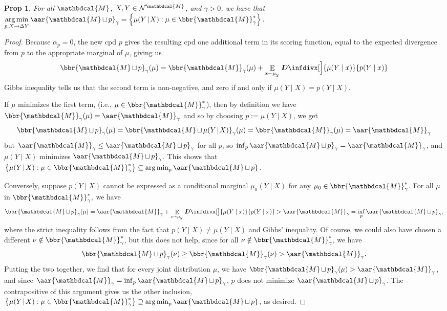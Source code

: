 \documentclass{article}
\theoremstyle{plain}
\newtheorem{prop}[theorem]{Prop}
\theoremstyle{definition}
\theoremstyle{remark}
\DeclareMathOperator*{\Ex}{\mathbb{E}} %
\DeclareMathOperator*{\argmin}{arg\,min}
\newcommand{\thickD}{I\mkern-8muD}
\newcommand{\kldiv}{\thickD\infdivx}
\newcommand{\N}{\mathcal N}
\newcommand{\dg}[1]{\mathbdcal{#1}}
\newcommand\smid{\!\mid\!}
\DeclareMathOperator{\bundle}{\sqcup}
\begin{document}
\begin{prop}
	For all $\dg M$, $X,Y\in\N^{\dg M}$, and $\gamma > 0$, we have that 
	$\displaystyle
		\argmin_{p : X \to \Delta Y} \aar{\dg M \bundle p}_\gamma = 
		\Big\{ \mu(Y \smid X) :  \mu \in \bbr{\dg M}_\gamma^* \Big\}
	$.
\end{prop}
\begin{proof}
	Because $\alpha_p = 0$, the new cpd $p$ gives the resulting cpd one 
	additional term in its scoring function, equal to the expected
	divergence from $p$ to the appropriate marginal of $\mu$, giving us
	$$
		\bbr{\dg M \bundle p}_\gamma(\mu) = \bbr{\dg M }_\gamma(\mu)
			+ \Ex_{x\sim\mu_{\!_X}} \kldiv[\Big]{\mu(Y\mid x)}{p(Y\mid x)}
	$$
	Gibbs inequality tells us that the second term is non-negative, and zero
	if and only if $\mu(Y \mid X) = p(Y \mid X)$. 
	
	If $\mu$ minimizes the first term, (i.e., $\mu \in \bbr{\dg M}^*_\gamma$), then by definition we have $\bbr{\dg M}_\gamma(\mu) = \aar{\dg M}_\gamma$ and so by choosing $p := \mu(Y \mid X)$, we get
	$$	\bbr{\dg M \bundle p}_\gamma(\mu) =
		\bbr{\dg M \bundle \mu(Y \smid X)}_\gamma(\mu) = \bbr{\dg M}_\gamma(\mu)
		= \aar{\dg M}_\gamma$$ 
	but $\aar{\dg M}_\gamma \leq \aar{\dg M \bundle p}_\gamma$ for all $p$, so
	$\inf_p \aar{\dg M \bundle p}_\gamma = \aar{\dg M}_\gamma$,
	and $\mu(Y\smid X)$ minimizes $\aar{\dg M \bundle p}_\gamma$. 
	This shows that $\big\{\mu(Y\smid X) : \mu \in \bbr{\dg M}_\gamma^* \big\} \subseteq \argmin_p \aar{\dg M \bundle p}$. 
	
	Conversely, suppose $p(Y\mid X)$ cannot be expressed as a conditional marginal
	$\mu_0(Y\mid X)$ for any $\mu_0 \in \bbr{\dg M}_\gamma^*$.
	For all $\mu$ in $\bbr{\dg M}_\gamma^*$, we have
	$$ 
		\bbr{\dg M \bundle p}_\gamma(\mu) = \aar{\dg M}_\gamma + \Ex_{x \sim
		\mu_{\!_X}} \kldiv[\big]{\mu(Y \mid x)}{p(Y \mid x)} > \aar{\dg
		M}_\gamma = \inf_p \aar{\dg M \bundle p}_\gamma,
	$$
	where the strict inequality follows from the fact that $p(Y\mid X) \ne \mu(Y\mid X)$ and Gibbs' inequality. 
	Of course, we could also have chosen a different $\nu \notin \bbr{\dg M}_\gamma^*$, but this does not help, since for all $\nu \notin \bbr{\dg M}_\gamma^*$, we have 	
	$$
		\bbr{\dg M \bundle p}_\gamma(\nu) \ge \bbr{\dg M}_\gamma(\nu) > \aar{\dg M}_\gamma.
	$$
	Putting the two together, we find that for every joint distribution $\mu$, 
	we have 
	$\bbr{\dg M \bundle p}_\gamma(\mu) > \aar{\dg M}_\gamma$,
	and since $\aar{\dg M}_\gamma = \inf_p \aar{\dg M \bundle p}_\gamma$, 
	$p$ does not minimize $\aar{\dg M \bundle p}_\gamma$. 
	The contrapositive of this argument gives us the other inclusion, $\big\{\mu(Y\smid X) : \mu \in \bbr{\dg M}_\gamma^* \big\} \supseteq \argmin_p \aar{\dg M \bundle p}$, as desired.

\end{proof}
\end{document}
